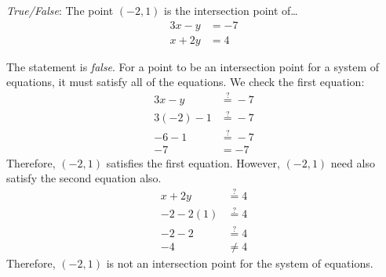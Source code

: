 \documentclass[11pt,letterpaper]{article}
\begin{document}
\quizsol \textit{True/False}: The point $(-2, 1)$ is the intersection point of\dots
	\[
	\begin{aligned}
	3x - y&= -7 \\
	x + 2y&= 4
	\end{aligned}
	\]

\sol The statement is \textit{false}. For a point to be an intersection point for a system of equations, it must satisfy all of the equations. We check the first equation:
	\[
	\begin{aligned}
	3x - y&\stackrel{?}{=} -7 \\
	3(-2) - 1&\stackrel{?}{=} -7 \\
	-6 - 1&\stackrel{?}{=} -7 \\
	-7&= -7
	\end{aligned}
	\]
Therefore, $(-2, 1)$ satisfies the first equation. However, $(-2, 1)$ need also satisfy the second equation also. 
	\[
	\begin{aligned}
	x + 2y&\stackrel{?}{=} 4 \\
	-2 - 2(1)&\stackrel{?}{=} 4 \\
	-2 - 2&\stackrel{?}{=} 4 \\
	-4&\neq 4
	\end{aligned}
	\]
Therefore, $(-2, 1)$ is not an intersection point for the system of equations. 
\end{document}

